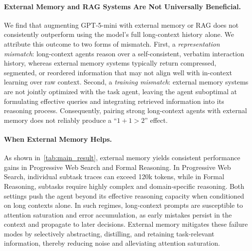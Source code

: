 
\vspace{-5pt}
\paragraph{External Memory and RAG Systems Are Not Universally Beneficial.}
We find that augmenting GPT-5-mini with external memory or RAG does not consistently outperform using the model’s full long-context history alone. We attribute this outcome to two forms of mismatch. First, a \emph{representation mismatch}: long-context agents reason over a self-consistent, verbatim interaction history, whereas external memory systems typically return compressed, segmented, or reordered information that may not align well with in-context learning over raw context. Second, a \emph{training mismatch}: external memory systems are not jointly optimized with the task agent, leaving the agent suboptimal at formulating effective queries and integrating retrieved information into its reasoning process. Consequently, pairing strong long-context agents with external memory does not reliably produce a “$1+1>2$” effect.


\paragraph{When External Memory Helps.}
As shown in~\cref{tab:main_result}, external memory yields consistent performance gains in Progressive Web Search and Formal Reasoning. In Progressive Web Search, individual subtask traces can exceed 120k tokens, while in Formal Reasoning, subtasks require highly complex and domain-specific reasoning. Both settings push the agent beyond its effective reasoning capacity when conditioned on long contexts alone. In such regimes, long-context prompts are susceptible to attention saturation and error accumulation, as early mistakes persist in the context and propagate to later decisions. External memory mitigates these failure modes by selectively abstracting, distilling, and retaining task-relevant information, thereby reducing noise and alleviating attention saturation.





